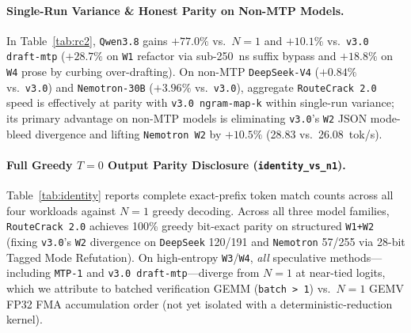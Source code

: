 \documentclass[10pt,twocolumn]{article}
\begin{document}
\paragraph{Single-Run Variance \& Honest Parity on Non-MTP Models.}
In Table~\ref{tab:rc2}, \texttt{Qwen3.8} gains $+77.0\%$ vs.\ $N=1$ and $+10.1\%$ vs.\ \texttt{v3.0 draft-mtp} ($+28.7\%$ on \texttt{W1} refactor via sub-250~ns suffix bypass and $+18.8\%$ on \texttt{W4} prose by curbing over-drafting). On non-MTP \texttt{DeepSeek-V4} ($+0.84\%$ vs.\ \texttt{v3.0}) and \texttt{Nemotron-30B} ($+3.96\%$ vs.\ \texttt{v3.0}), aggregate \texttt{RouteCrack 2.0} speed is effectively at parity with \texttt{v3.0 ngram-map-k} within single-run variance; its primary advantage on non-MTP models is eliminating \texttt{v3.0}'s \texttt{W2} JSON mode-bleed divergence and lifting \texttt{Nemotron W2} by $+10.5\%$ (28.83 vs.\ 26.08~tok/s).

\paragraph{Full Greedy $T=0$ Output Parity Disclosure (\texttt{identity\_vs\_n1}).}
Table~\ref{tab:identity} reports complete exact-prefix token match counts across all four workloads against $N=1$ greedy decoding. Across all three model families, \texttt{RouteCrack 2.0} achieves 100\% greedy bit-exact parity on structured \texttt{W1+W2} (fixing \texttt{v3.0}'s \texttt{W2} divergence on \texttt{DeepSeek} 120/191 and \texttt{Nemotron} 57/255 via 28-bit Tagged Mode Refutation). On high-entropy \texttt{W3}/\texttt{W4}, \emph{all} speculative methods---including \texttt{MTP-1} and \texttt{v3.0 draft-mtp}---diverge from $N=1$ at near-tied logits, which we attribute to batched verification GEMM (\texttt{batch > 1}) vs.\ $N=1$ GEMV FP32 FMA accumulation order (not yet isolated with a deterministic-reduction kernel).
\end{document}

